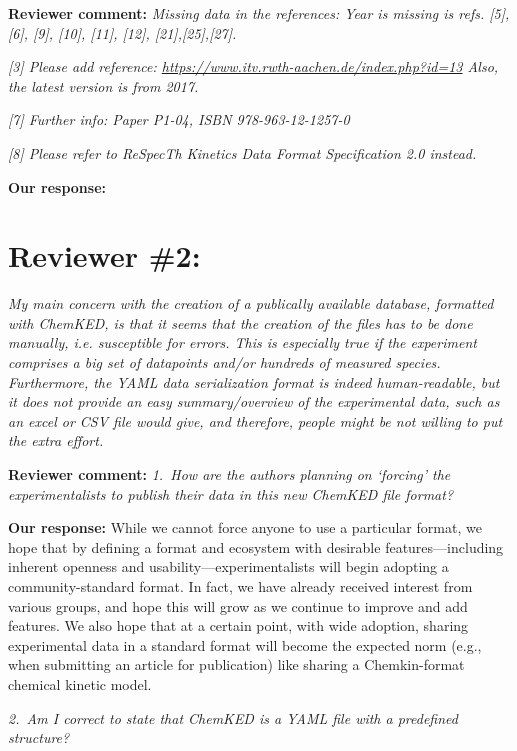 \documentclass[a4paper,10pt]{elsarticle}
\begin{document}
\textbf{Reviewer comment:}
\textit{Missing data in the references: Year is missing is refs. [5], [6], [9], [10], [11], [12], [21],[25],[27].
}

\textit{[3] Please add reference: \url{https://www.itv.rwth-aachen.de/index.php?id=13}
Also, the latest version is from 2017.
}

\textit{[7] Further info:  Paper P1-04, ISBN 978-963-12-1257-0}

\textit{[8] Please refer to ReSpecTh Kinetics Data Format Specification 2.0 instead.}

\textbf{Our response:}





\section*{Reviewer \#2:}

\textit{My main concern with the creation of a publically available database, formatted with ChemKED, is that it seems that the creation of the files has to be done manually, i.e. susceptible for errors. This is especially true if the experiment comprises a big set of datapoints and/or hundreds of measured species. Furthermore, the YAML data serialization format is indeed human-readable, but it does not provide an easy summary/overview of the experimental data, such as an excel or CSV file would give, and therefore, people might be not willing to put the extra effort.}


\textbf{Reviewer comment:}
\textit{1.~How are the authors planning on `forcing' the experimentalists to publish their data in this new ChemKED file format?}

\textbf{Our response:}
While we cannot force anyone to use a particular format, we hope that by defining a format and ecosystem with desirable features---including inherent openness and usability---experimentalists will begin adopting a community-standard format. In fact, we have already received interest from various groups, and hope this will grow as we continue to improve and add features. We also hope that at a certain point, with wide adoption, sharing experimental data in a standard format will become the expected norm (e.g., when submitting an article for publication) like sharing a Chemkin-format chemical kinetic model.


\textit{2.~Am I correct to state that ChemKED is a YAML file with a predefined structure?}
\end{document}
